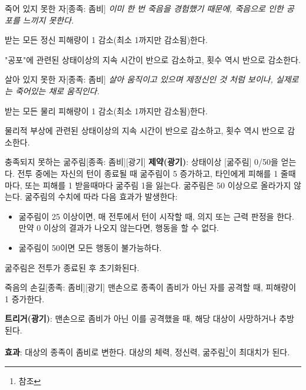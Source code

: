 \documentclass{report}
\begin{document}
	\begin{story}{죽어 있지 못한 자}{[종족: 좀비]}
		\textit{이미 한 번 죽음을 경험했기 때문에, 죽음으로 인한 공포를 느끼지 못한다.}
		
		받는 모든 정신 피해량이 1 감소(최소 1까지만 감소됨)한다.
		
		"공포"에 관련된 상태이상의 지속 시간이 반으로 감소하고, 횟수 역시 반으로 감소한다.
		
		\smallskip
		
	\end{story}
	
	\begin{story}{살아 있지 못한 자}{[종족: 좀비]}
		\textit{살아 움직이고 있으며 제정신인 것 처럼 보이나, 실제로는 죽어있는 채로 움직인다.}
		
		받는 모든 물리 피해량이 1 감소(최소 1까지만 감소됨)한다.
		
		물리적 부상에 관련된 상태이상의 지속 시간이 반으로 감소하고, 횟수 역시 반으로 감소한다.
		
	\end{story}
	
	\begin{story}{충족되지 못하는 굶주림}{[종족: 좀비][광기]}
		\textbf{제약(광기)}: 상태이상 [굶주림] 0/50을 얻는다. 전투 중에는 자신의 턴이 종료될 때 굶주림이 5 증가하고, 타인에게 피해를 1 줄때마다, 또는 피해를 1 받을때마다 굶주림 1을 잃는다. 굶주림은 50 이상으로 올라가지 않는다. 굶주림의 수치에 따라 다음 효과가 발생한다:
		\begin{itemize}
			\item 굶주림이 25 이상이면, 매 전투에서 턴이 시작할 때, 의지 또는 근력 판정을 한다. 만약 0 이상의 결과가 나오지 않는다면, 행동을 할 수 없다.
			\item 굶주림이 50이면 모든 행동이 불가능하다.
		\end{itemize}
		굶주림은 전투가 종료된 후 초기화된다.
		
	\end{story}
	
	\begin{story}{죽음의 손길}{[종족: 좀비][광기]}
		맨손으로 종족이 좀비가 아닌 자를 공격할 때, 피해량이 1 증가한다.
		
		\textbf{트리거(광기)}: 맨손으로 좀비가 아닌 이를 공격했을 때, 해당 대상이 사망하거나 추방된다.
		
		\textbf{효과}: 대상의 종족이 좀비로 변한다. 대상의 체력, 정신력, 굶주림\footnote{ 참조}이 최대치가 된다.
		
	\end{story}
\end{document}
